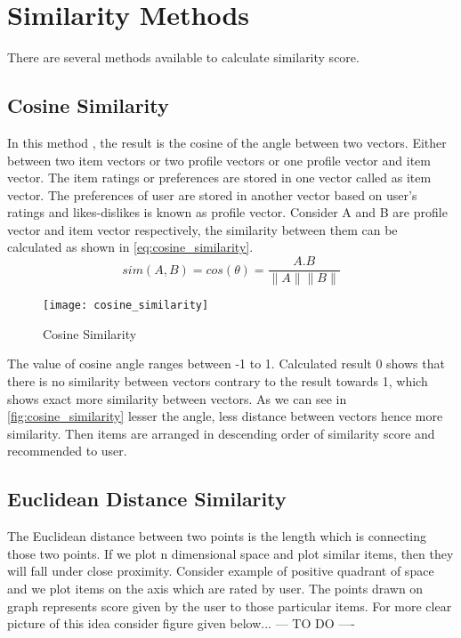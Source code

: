 
\section{Similarity Methods}
There are several methods available to calculate similarity score.
\\

\subsection{Cosine Similarity}
\label{cosine_similarity}
In this method \cite{19}, the result is the cosine of the angle between two vectors. Either between two item vectors or two profile vectors or one profile vector and item vector. The item ratings or preferences are stored in one vector called as item vector. The preferences of user are stored in another vector based on user's ratings and likes-dislikes is known as profile vector. Consider A and B are profile vector and item vector respectively, the similarity between them can be calculated as shown in \autoref{eq:cosine_similarity}.
\\

\begin{equation}
sim(A,B) = cos(\theta) =\frac {A.B}{\parallel A \parallel \parallel B \parallel}
\label{eq:cosine_similarity}
\end{equation}

\begin{figure}[H]
	\centering
	\texttt{[image: cosine\_similarity]}
	\caption{Cosine Similarity}
	\label{fig:cosine_similarity}
\end{figure}

\noindent The value of cosine angle ranges between -1 to 1. Calculated result 0 shows that there is no similarity between vectors contrary to the result towards 1, which shows exact more similarity between vectors. As we can see in \autoref{fig:cosine_similarity} lesser the angle, less distance between vectors hence more similarity. Then items are arranged in descending order of similarity score and recommended to user.
\\
\subsection{Euclidean Distance Similarity}
\label{euclidean_distance}
The Euclidean distance between two points is the length which is connecting those two points. If we plot n dimensional space and plot similar items, then they will fall under close proximity. Consider example of positive quadrant of space and we plot items on the axis which are rated by user. The points drawn on graph represents score given by the user to those particular items. For more clear picture of this idea consider figure given below...
--- TO DO ----

